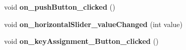 \begin{DoxyCompactItemize}
\item 
\hypertarget{class_main_window_a4de79c63c7fa0b8d7c468ac71f20be81}{}void {\bfseries on\+\_\+push\+Button\+\_\+clicked} ()\label{class_main_window_a4de79c63c7fa0b8d7c468ac71f20be81}

\item 
\hypertarget{class_main_window_afbcef9f3e5a68f8709c86299b0f5d6a9}{}void {\bfseries on\+\_\+horizontal\+Slider\+\_\+value\+Changed} (int value)\label{class_main_window_afbcef9f3e5a68f8709c86299b0f5d6a9}

\item 
\hypertarget{class_main_window_a3f9d31ee127119a82b48c230d38f3c5f}{}void {\bfseries on\+\_\+key\+Assignment\+\_\+\+Button\+\_\+clicked} ()\label{class_main_window_a3f9d31ee127119a82b48c230d38f3c5f}

\end{DoxyCompactItemize}
